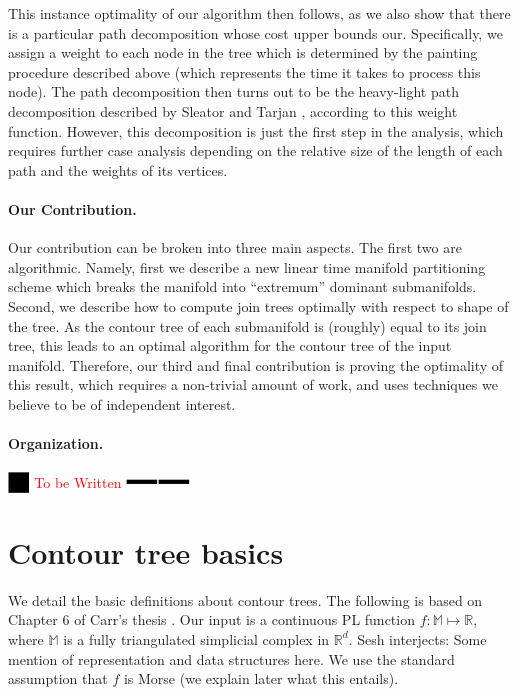\documentclass[11pt]{article}
\theoremstyle{definition}
\newcommand{\MM}{\mathbb{M}}
\newcommand{\RR}{\mathbb{R}}
\newcommand{\Reminder}[1]{{\color{red}#1}}
\newcommand{\Sesh}[1]{\Reminder{Sesh interjects: #1}}
\newcommand{\XSays}[2]{{
      {$\rule[-0.12cm]{0.2in}{0.5cm}$\fbox{\tt
            #1:} }
      \textcolor{red}{#2}
      \marginpar{\textcolor{blue}{#1}}
      {$\rule[0.1cm]{0.3in}{0.1cm}$\fbox{\tt
            end}$\rule[0.1cm]{0.3in}{0.1cm}$}
      }
   }
\newcommand{\Ben}[1]{{\XSays{Ben}{#1}}}
\begin{document}
This instance optimality of our algorithm then follows, as we also show that there is a particular path decomposition 
whose cost upper bounds our.  Specifically, we assign a weight to each node in the tree which is determined by 
the painting procedure described above (which represents the time it takes to process this node).  
The path decomposition then turns out to be the heavy-light path decomposition 
described by Sleator and Tarjan \cite{st-dsdt-83}, according to this weight function.
However, this decomposition is just the first step in the analysis, which 
requires further case analysis depending on the relative size of the length of each path 
and the weights of its vertices.

\paragraph{Our Contribution.}
Our contribution can be broken into three main aspects.  The first two are algorithmic.  Namely, 
first we describe a new linear time manifold partitioning scheme which breaks the manifold into 
``extremum'' dominant submanifolds.  
Second, we describe how to compute join trees optimally with respect to shape of the tree.
As the contour tree of each submanifold is (roughly) equal to its join tree, this leads to an 
optimal algorithm for the contour tree of the input manifold.  
Therefore, our third and final contribution is proving the optimality of this result, which 
requires a non-trivial amount of work, and uses techniques we believe to be of independent interest.

\paragraph{Organization.}
\Ben{To be Written}

\section{Contour tree basics} \label{sec:basics}

We detail the basic definitions about contour trees. The following is based on Chapter 6 of Carr's thesis \cite{c-tmi-04}.
Our input is a continuous PL function $f:\MM \mapsto \RR$, where $\MM$ is a fully triangulated simplicial complex in $\RR^d$. 
\Sesh{Some mention of representation and data structures here.}
We use the standard assumption that $f$ is Morse (we explain later what this entails). 
\end{document}

